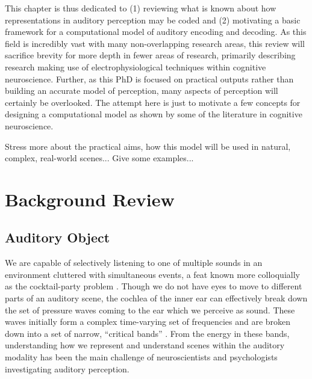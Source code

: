 \documentclass[a4paper,10pt,final]{ThesisStyle}
\begin{document}
This chapter is thus dedicated to (1) reviewing what is known about how representations in auditory perception may be coded and (2) motivating a basic framework for a computational model of auditory encoding and decoding.  As this field is incredibly vast with many non-overlapping research areas, this review will sacrifice brevity for more depth in fewer areas of research, primarily describing research making use of electrophysiological techniques within cognitive neuroscience.  Further, as this PhD is focused on practical outputs rather than building an accurate model of perception, many aspects of perception will certainly be overlooked.  The attempt here is just to motivate a few concepts for designing a computational model as shown by some of the literature in cognitive neuroscience.   

Stress more about the practical aims, how this model will be used in natural, complex, real-world scenes... Give some examples... 

\section{Background Review}

\subsection{Auditory Object}


We are capable of selectively listening to one of multiple sounds in an environment cluttered with simultaneous events, a feat known more colloquially as the cocktail-party problem \cite{McDermott2009}.  Though we do not have eyes to move to different parts of an auditory scene, the cochlea of the inner ear can effectively break down the set of pressure waves coming to the ear which we perceive as sound.  These waves initially form a complex time-varying set of frequencies and are broken down into a set of narrow, ``critical bands'' \cite{Fletcher1940}.  From the energy in these bands, understanding how we represent and understand scenes within the auditory modality has been the main challenge of neuroscientists and psychologists investigating auditory perception.  
\end{document}
